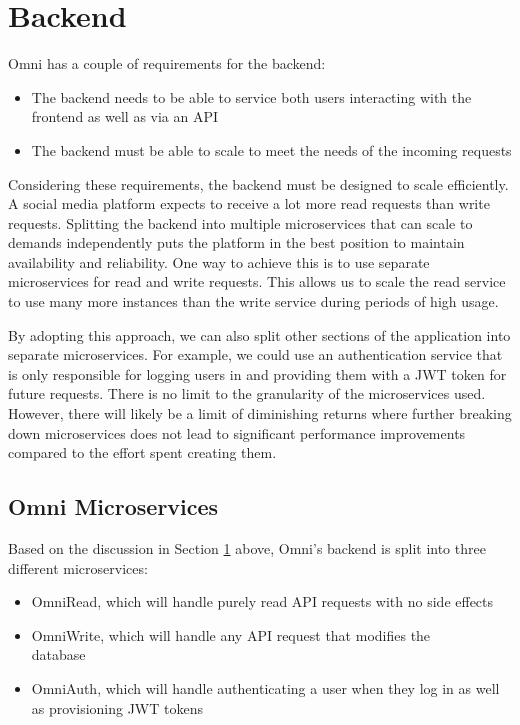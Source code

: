 \section{Backend}
\label{sec:design-system-backend}
Omni has a couple of requirements for the backend:
\begin{itemize}
    \item The backend needs to be able to service both users interacting with the frontend as well as via an API
    \item The backend must be able to scale to meet the needs of the incoming requests
\end{itemize}
Considering these requirements, the backend must be designed to scale efficiently. A social media platform expects to receive a lot more read requests than write requests.
Splitting the backend into multiple microservices that can scale to demands independently puts the platform in the best position to maintain availability and reliability. 
One way to achieve this is to use separate microservices for read and write requests. This allows us to scale the read service to use many more instances than the write service during periods of high usage. 

By adopting this approach, we can also split other sections of the application into separate microservices.
For example, we could use an authentication service that is only responsible for logging users in and providing them with a JWT token for future requests.
There is no limit to the granularity of the microservices used.
However, there will likely be a limit of diminishing returns where further breaking down microservices does not lead to significant performance improvements compared to the effort spent creating them.

\subsection{Omni Microservices}
\label{sec:design-system-backend-microservices}
Based on the discussion in Section \ref{sec:design-system-backend} above, Omni's backend is split into three different microservices:
\begin{itemize}
    \item OmniRead, which will handle purely read API requests with no side effects
    \item OmniWrite, which will handle any API request that modifies the \\database
    \item OmniAuth, which will handle authenticating a user when they log in as well as provisioning JWT tokens
\end{itemize}

